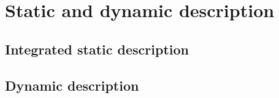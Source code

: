 \chapter{Static and dynamic description}
\section{Integrated static description}
\section{Dynamic description}